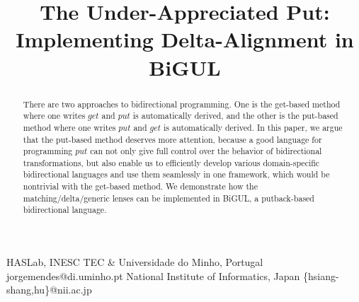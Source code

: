 \documentclass[numbers]{sigplanconf}
\newif\ifanonymous
\newcommand{\Varid}[1]{\mathit{#1}}
\begin{document}
\GRACETRmakecover

\setlength{\pdfpageheight}{\paperheight}
\setlength{\pdfpagewidth}{\paperwidth}

\toappear{}




\title{The Under-Appreciated Put: Implementing Delta-Alignment in BiGUL}

\ifanonymous
\authorinfo{}{}{}
\else
{}
           {\hspace{-.5cm}HASLab, INESC TEC \& Universidade do Minho, Portugal\hspace{-.5cm}}
           {jorgemendes@di.uminho.pt}
           {National Institute of Informatics, Japan}
           {\{hsiang-shang,hu\}@nii.ac.jp}
\fi

\maketitle

\begin{abstract}
There are two approaches to bidirectional programming.
One is the get-based method where one writes \ensuremath{\Varid{get}} and
\ensuremath{\Varid{put}} is automatically derived, and the other is
the put-based method where one writes \ensuremath{\Varid{put}} and
\ensuremath{\Varid{get}} is automatically derived.
In this paper, we argue that the put-based method
deserves more attention, because
a good language for programming \ensuremath{\Varid{put}} can not only
give full control over the behavior of bidirectional transformations,
but also enable us to efficiently
develop various domain-specific bidirectional languages and use
them seamlessly in one framework, which
would be nontrivial with the get-based method.
We demonstrate how the matching/delta/generic lenses can be
implemented in BiGUL, a putback-based
bidirectional language.
\end{abstract}
\end{document}
